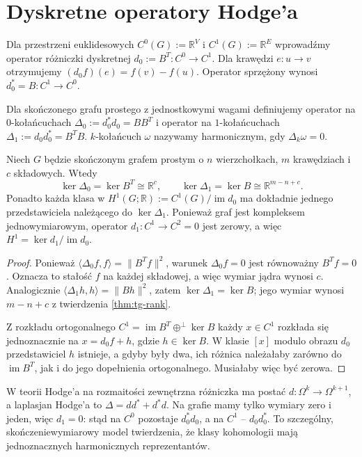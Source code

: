 \section{Dyskretne operatory Hodge'a}
\label{sec:tg-hodge-operators}

Dla przestrzeni euklidesowych $C^0(G):=\mathbb R^V$
i $C^1(G):=\mathbb R^E$ wprowadźmy operator
różniczki dyskretnej $d_0:=B^T:C^0\to C^1$.
Dla krawędzi $e:u\to v$ otrzymujemy
$(d_0f)(e)=f(v)-f(u)$.
Operator sprzężony wynosi $d_0^*=B:C^1\to C^0$.

\begin{definicja}
Dla skończonego grafu prostego z jednostkowymi wagami
definiujemy operator na $0$-kołańcuchach
$\Delta_0:=d_0^*d_0=BB^T$ i operator na
$1$-kołańcuchach $\Delta_1:=d_0d_0^*=B^TB$.
$k$-kołańcuch $\omega$ nazywamy harmonicznym,
gdy $\Delta_k\omega=0$.
\end{definicja}

\begin{twierdzenie}
\label{thm:tg-hodge-harmonic}
Niech $G$ będzie skończonym grafem prostym o $n$ wierzchołkach,
$m$ krawędziach i $c$ składowych. Wtedy
\[
\ker\Delta_0=\ker B^T\cong\mathbb R^c,
\qquad
\ker\Delta_1=\ker B\cong\mathbb R^{m-n+c}.
\]
Ponadto każda klasa w
$H^1(G;\mathbb R):=C^1(G)/\operatorname{im}d_0$
ma dokładnie jednego przedstawiciela należącego do
$\ker\Delta_1$. Ponieważ graf jest kompleksem
jednowymiarowym, operator $d_1:C^1\to C^2=0$ jest zerowy,
a więc $H^1=\ker d_1/\operatorname{im}d_0$.
\end{twierdzenie}

\begin{proof}
Ponieważ $\langle\Delta_0f,f\rangle=\|B^Tf\|^2$,
warunek $\Delta_0f=0$ jest równoważny $B^Tf=0$.
Oznacza to stałość $f$ na każdej składowej,
a więc wymiar jądra wynosi $c$.
Analogicznie $\langle\Delta_1h,h\rangle=\|Bh\|^2$,
zatem $\ker\Delta_1=\ker B$; jego wymiar
wynosi $m-n+c$ z twierdzenia \ref{thm:tg-rank}.

Z rozkładu ortogonalnego
$C^1=\operatorname{im}B^T\oplus^\perp\ker B$
każdy $x\in C^1$ rozkłada się jednoznacznie na
$x=d_0f+h$, gdzie $h\in\ker B$. W klasie $[x]$
modulo obrazu $d_0$ przedstawiciel $h$ istnieje,
a gdyby były dwa, ich różnica należałaby zarówno
do $\operatorname{im}B^T$, jak i do jego dopełnienia
ortogonalnego. Musiałaby więc być zerowa.
\end{proof}

\begin{uwaga}
W teorii Hodge'a na rozmaitości zewnętrzna różniczka
ma postać $d:\Omega^k\to\Omega^{k+1}$, a laplasjan
Hodge'a to $\Delta=dd^*+d^*d$. Na grafie mamy tylko
wymiary zero i jeden, więc $d_1=0$: stąd na
$C^0$ pozostaje $d_0^*d_0$, a na $C^1$ -- $d_0d_0^*$.
To szczególny, skończeniewymiarowy model twierdzenia,
że klasy kohomologii mają jednoznacznych harmonicznych
reprezentantów.
\end{uwaga}

